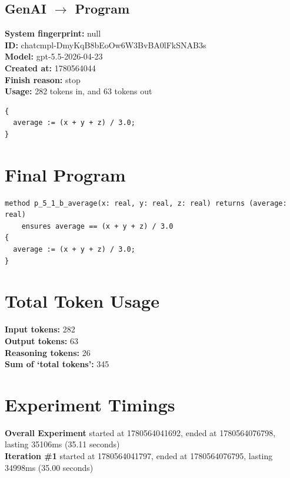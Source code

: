 \documentclass{article}
\begin{document}
\subsection*{GenAI $\rightarrow$ Program}
\textbf{System fingerprint: }null
\\\textbf{ID: }chatcmpl-DmyKqB8bEoOw6W3BvBA0lFkSNAB3s
\\\textbf{Model: }gpt-5.5-2026-04-23
\\\textbf{Created at: }1780564044
\\\textbf{Finish reason: }stop
\\\textbf{Usage: }282 tokens in, and 63 tokens out
\begin{lstlisting}
{
  average := (x + y + z) / 3.0;
}
\end{lstlisting}
\section*{Final Program}
\begin{lstlisting}
method p_5_1_b_average(x: real, y: real, z: real) returns (average: real)
	ensures average == (x + y + z) / 3.0
{
  average := (x + y + z) / 3.0;
}
\end{lstlisting}
\section*{Total Token Usage}
\textbf{Input tokens: }282
\\\textbf{Output tokens: }63
\\\textbf{Reasoning tokens: }26
\\\textbf{Sum of `total tokens': }345
\section*{Experiment Timings}
\textbf{Overall Experiment} started at 1780564041692, ended at 1780564076798, lasting 35106ms (35.11 seconds)
\\\textbf{Iteration \#1} started at 1780564041797, ended at 1780564076795, lasting 34998ms (35.00 seconds)
\end{document}
